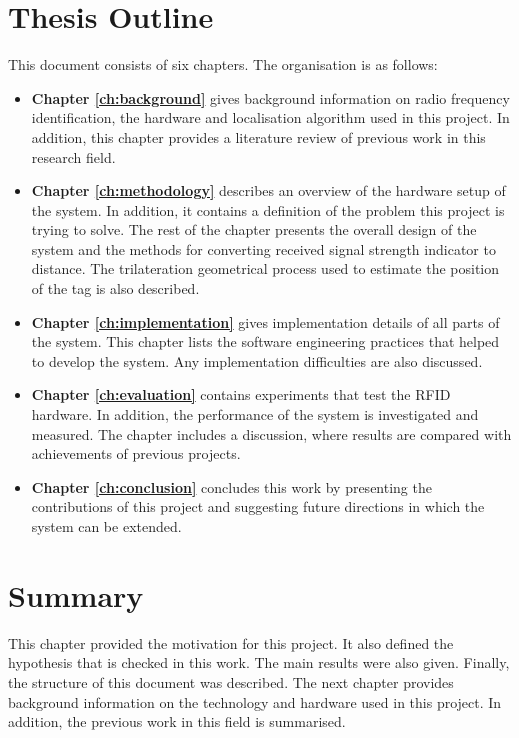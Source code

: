 \section{Thesis Outline}

This document consists of six chapters. The organisation is as follows:
\begin{itemize}
\item \textbf{Chapter \ref{ch:background}} gives background information on radio frequency identification, the hardware and  localisation algorithm used in this project. In addition, this chapter provides a literature review of previous work in this research field.
\item \textbf{Chapter \ref{ch:methodology}} describes an overview of the hardware setup of the system. In addition, it contains a definition of the problem this project is trying to solve. The rest of the chapter presents the overall design of the system and the methods for converting received signal strength indicator to distance. The trilateration geometrical process used to estimate the position of the tag is also described.
\item \textbf{Chapter \ref{ch:implementation}} gives implementation details of all parts of the system. This chapter lists the software engineering practices that helped to develop the system. Any implementation difficulties are also discussed.
\item \textbf{Chapter \ref{ch:evaluation}} contains experiments that test the RFID hardware. In addition, the performance of the system is investigated and measured. The chapter includes a discussion, where results are compared with achievements of previous projects.
\item \textbf{Chapter \ref{ch:conclusion}} concludes this work by presenting the contributions of this project and suggesting future directions in which the system can be extended.
\end{itemize}

\section{Summary}

This chapter provided the motivation for this project. It also defined the hypothesis that is checked in this work. The main results were also given. Finally, the structure of this document was described. The next chapter provides background information on the technology and hardware used in this project. In addition, the previous work in this field is summarised.
